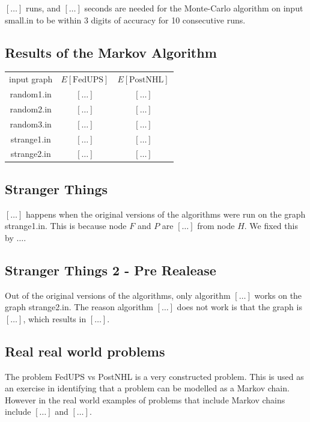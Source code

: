 \documentclass{tufte-handout}
\begin{document}
$[\ldots]$ runs, and $[\ldots]$ seconds are needed for the Monte-Carlo algorithm on input small.in to be within $3$ digits of accuracy for 10 consecutive runs.

\subsection{Results of the Markov Algorithm}

\begin{tabular}{c c c}
    input graph & $E[\text{FedUPS}]$ & $E[\text{PostNHL}]$ \\
    random1.in & $[\ldots]$ & $[\ldots]$ \\
    random2.in & $[\ldots]$ & $[\ldots]$ \\
    random3.in & $[\ldots]$ & $[\ldots]$ \\
    strange1.in & $[\ldots]$ & $[\ldots]$ \\
    strange2.in & $[\ldots]$ & $[\ldots]$ \\
\end{tabular}

\subsection{Stranger Things}
$[\ldots]$ happens when the original versions of the algorithms were run on the graph strange1.in. 
This is because node $F$ and $P$ are $[\ldots]$ from node $H$. We fixed this by ${\ldots}$.

\subsection{Stranger Things 2 - Pre Realease}
Out of the original versions of the algorithms, only algorithm $[\ldots]$ works on the graph strange2.in. 
The reason algorithm $[\ldots]$ does not work is that the graph is $[\ldots]$, which results in $[\ldots]$.


\subsection{Real real world problems}
The problem FedUPS vs PostNHL is a very constructed problem. 
This is used as an exercise in identifying that a problem can be modelled as a Markov chain.
However in the real world examples of problems that include Markov chains include $[\ldots]$ and $[\ldots]$.
\end{document}
